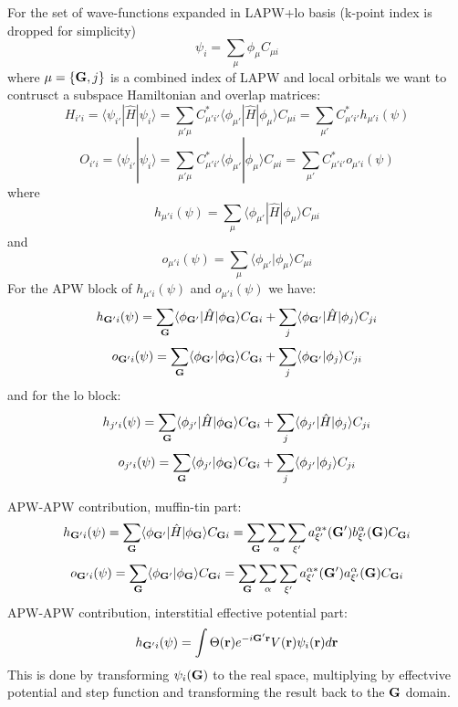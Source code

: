 For the set of wave-\/functions expanded in L\+A\+P\+W+lo basis (k-\/point index is dropped for simplicity) \[ \psi_{i} = \sum_{\mu} \phi_{\mu} C_{\mu i} \] where $ \mu = \{ {\bf G}, j \} $ is a combined index of L\+A\+P\+W and local orbitals we want to contrusct a subspace Hamiltonian and overlap matrices\+: \[ H_{i' i} = \langle \psi_{i'} | \hat H | \psi_i \rangle = \sum_{\mu' \mu} C_{\mu' i'}^{*} \langle \phi_{\mu'} | \hat H | \phi_{\mu} \rangle C_{\mu i} = \sum_{\mu'} C_{\mu' i'}^{*} h_{\mu' i}(\psi) \] \[ O_{i' i} = \langle \psi_{i'} | \psi_i \rangle = \sum_{\mu' \mu} C_{\mu' i'}^{*} \langle \phi_{\mu'} | \phi_{\mu} \rangle C_{\mu i} = \sum_{\mu'} C_{\mu' i'}^{*} o_{\mu' i}(\psi) \] where \[ h_{\mu' i}(\psi) = \sum_{\mu} \langle \phi_{\mu'} | \hat H | \phi_{\mu} \rangle C_{\mu i} \] and \[ o_{\mu' i}(\psi) = \sum_{\mu} \langle \phi_{\mu'} | \phi_{\mu} \rangle C_{\mu i} \] For the A\+P\+W block of $ h_{\mu' i}(\psi) $ and $ o_{\mu' i}(\psi) $ we have\+: \[ h_{{\bf G'} i}(\psi) = \sum_{{\bf G}} \langle \phi_{\bf G'} | \hat H | \phi_{\bf G} \rangle C_{{\bf G} i} + \sum_{j} \langle \phi_{\bf G'} | \hat H | \phi_{j} \rangle C_{j i} \] \[ o_{{\bf G'} i}(\psi) = \sum_{{\bf G}} \langle \phi_{\bf G'} | \phi_{\bf G} \rangle C_{{\bf G} i} + \sum_{j} \langle \phi_{\bf G'} | \phi_{j} \rangle C_{j i} \] and for the lo block\+: \[ h_{j' i}(\psi) = \sum_{{\bf G}} \langle \phi_{j'} | \hat H | \phi_{\bf G} \rangle C_{{\bf G} i} + \sum_{j} \langle \phi_{j'} | \hat H | \phi_{j} \rangle C_{j i} \] \[ o_{j' i}(\psi) = \sum_{{\bf G}} \langle \phi_{j'} | \phi_{\bf G} \rangle C_{{\bf G} i} + \sum_{j} \langle \phi_{j'} | \phi_{j} \rangle C_{j i} \]

A\+P\+W-\/\+A\+P\+W contribution, muffin-\/tin part\+: \[ h_{{\bf G'} i}(\psi) = \sum_{{\bf G}} \langle \phi_{\bf G'} | \hat H | \phi_{\bf G} \rangle C_{{\bf G} i} = \sum_{{\bf G}} \sum_{\alpha} \sum_{\xi'} a_{\xi'}^{\alpha *}({\bf G'}) b_{\xi'}^{\alpha}({\bf G}) C_{{\bf G} i} \] \[ o_{{\bf G'} i}(\psi) = \sum_{{\bf G}} \langle \phi_{\bf G'} | \phi_{\bf G} \rangle C_{{\bf G} i} = \sum_{{\bf G}} \sum_{\alpha} \sum_{\xi'} a_{\xi'}^{\alpha *}({\bf G'}) a_{\xi'}^{\alpha}({\bf G}) C_{{\bf G} i} \] A\+P\+W-\/\+A\+P\+W contribution, interstitial effective potential part\+: \[ h_{{\bf G'} i}(\psi) = \int \Theta({\bf r}) e^{-i{\bf G'}{\bf r}} V({\bf r}) \psi_{i}({\bf r}) d{\bf r} \] This is done by transforming $ \psi_i({\bf G}) $ to the real space, multiplying by effectvive potential and step function and transforming the result back to the $ {\bf G} $ domain.

